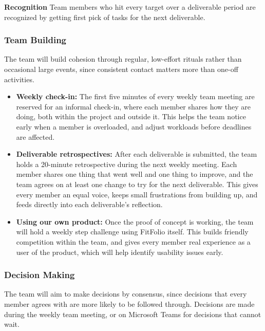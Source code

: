 \documentclass{article}
\begin{document}
\textbf{Recognition} \newline
Team members who hit every target over a deliverable period are recognized by getting first pick of tasks for the next deliverable.

\subsubsection*{Team Building}

The team will build cohesion through regular, low-effort rituals rather than occasional large events, since consistent contact matters more than one-off activities.

\begin{itemize}
  \item \textbf{Weekly check-in:} The first five minutes of every weekly team meeting are reserved for an informal check-in, where each member shares how they are doing, both within the project and outside it. 
  This helps the team notice early when a member is overloaded, and adjust workloads before deadlines are affected.
  \item \textbf{Deliverable retrospectives:} After each deliverable is submitted, the team holds a 20-minute retrospective during the next weekly meeting. 
  Each member shares one thing that went well and one thing to improve, and the team agrees on at least one change to try for the next deliverable. 
  This gives every member an equal voice, keeps small frustrations from building up, and feeds directly into each deliverable's reflection.
  \item \textbf{Using our own product:} Once the proof of concept is working, the team will hold a weekly step challenge using FitFolio itself. 
  This builds friendly competition within the team, and gives every member real experience as a user of the product, which will help identify usability issues early.
\end{itemize}

\subsubsection*{Decision Making}
\label{sec:decision-making}


The team will aim to make decisions by consensus, since decisions that every member agrees with are more likely to be followed through. Decisions are made during the weekly team meeting, or on Microsoft Teams for decisions that cannot wait.
\end{document}
